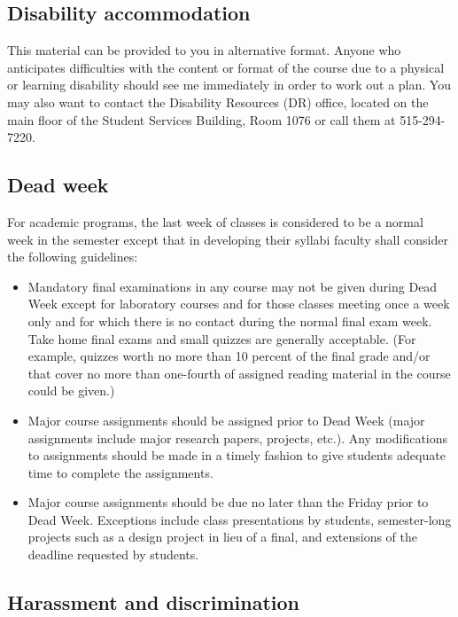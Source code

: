 \documentclass[nofonts,nols]{tufte-handout}
\begin{document}
\subsection*{Disability accommodation}

This material can be provided to you in alternative format. Anyone who
anticipates difficulties with the content or format of the course due
to a physical or learning disability should see me immediately in
order to work out a plan. You may also want to contact the Disability
Resources (DR) office, located on the main floor of the Student
Services Building, Room 1076 or call them at 515-294-7220.

\subsection*{Dead week}

For academic programs, the last week of classes is considered to be a
normal week in the semester except that in developing their syllabi
faculty shall consider the following guidelines:

\begin{itemize}
\item Mandatory final examinations in any course may not be given
  during Dead Week except for laboratory courses and for those classes
  meeting once a week only and for which there is no contact during
  the normal final exam week. Take home final exams and small quizzes
  are generally acceptable. (For example, quizzes worth no more than
  10 percent of the final grade and/or that cover no more than
  one-fourth of assigned reading material in the course could be
  given.)
\item Major course assignments should be assigned prior to Dead Week
  (major assignments include major research papers, projects,
  etc.). Any modifications to assignments should be made in a timely
  fashion to give students adequate time to complete the assignments.
\item Major course assignments should be due no later than the Friday
  prior to Dead Week. Exceptions include class presentations by
  students, semester-long projects such as a design project in lieu of
  a final, and extensions of the deadline requested by students.
\end{itemize}

\subsection*{Harassment and discrimination}
\end{document}
